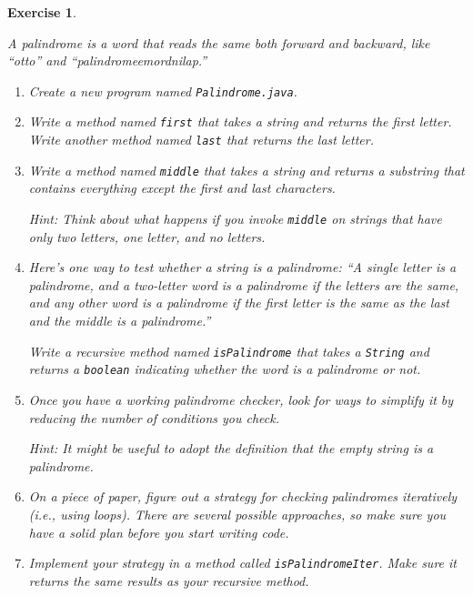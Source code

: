 \documentclass[12pt]{book}
\theoremstyle{exercise}
\newtheorem{exercise}{Exercise}[chapter]
\newcommand{\java}[1]{\verb"#1"}
\newcommand{\java}[1]{\lstinline{#1}} %
\begin{document}
\begin{exercise}
\label{palindrome}

A palindrome is a word that reads the same both forward and backward, like ``otto'' and ``palindromeemordnilap.''

\begin{enumerate}

\item Create a new program named {\tt Palindrome.java}.

\item Write a method named \java{first} that takes a string and returns the first letter.
Write another method named \java{last} that returns the last letter.

\item Write a method named \java{middle} that takes a string and returns a substring that contains everything {\em except} the
first and last characters.


Hint: Think about what happens if you invoke \java{middle} on strings that have only two letters, one letter, and no letters.

\item Here's one way to test whether a string is a palindrome:
``A single letter is a palindrome, and a two-letter word is a palindrome if the letters are the same, and any other word is a palindrome if the first letter is the same as the last and the middle is a palindrome.''

Write a recursive method named \java{isPalindrome} that takes a \java{String} and returns a \java{boolean} indicating whether the word is a palindrome or not.

\item Once you have a working palindrome checker, look for ways to simplify it by reducing the number of conditions you check.

Hint: It might be useful to adopt the definition that the empty string is a palindrome.

\item On a piece of paper, figure out a strategy for checking palindromes iteratively (i.e., using loops).
There are several possible approaches, so make sure you have a solid plan before you start writing code.

\item Implement your strategy in a method called \java{isPalindromeIter}.
Make sure it returns the same results as your recursive method.


\end{enumerate}

\end{exercise}
\end{document}
